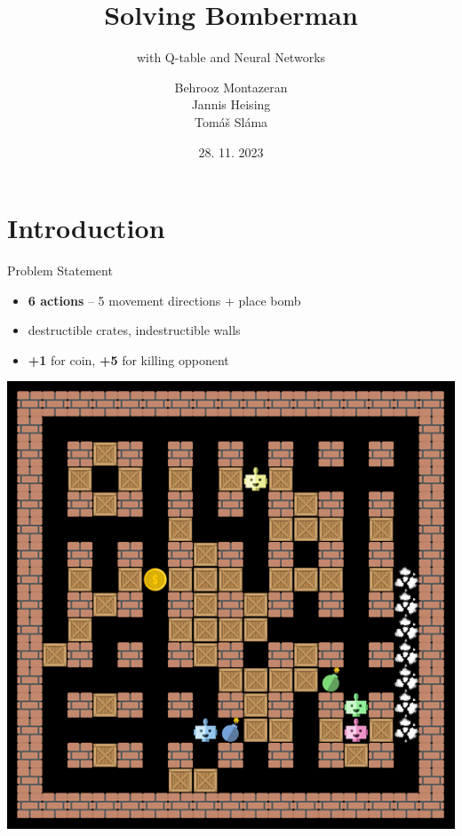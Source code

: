 \documentclass{beamer}
\title{Solving Bomberman}
\subtitle{\large with Q-table and Neural Networks}
\author{\small Behrooz Montazeran\texorpdfstring{\\}{,} Jannis Heising\texorpdfstring{\\}{,} Tomáš Sláma}
\date{28. 11. 2023}
\begin{document}
\begin{frame}
	\maketitle
\end{frame}

\section{Introduction}

\begin{frame}{Problem Statement}
	\pause

	\begin{itemize}
		\item \textbf{6 actions} -- 5 movement directions + place bomb
		\item destructible crates, indestructible walls
		\item \textbf{+1} for coin, \textbf{+5} for killing opponent
	\end{itemize}
	\vfill
	\begin{center}
		\includegraphics[width=0.4\linewidth]{bomberman_example.png}
	\end{center}
\end{frame}
\end{document}
